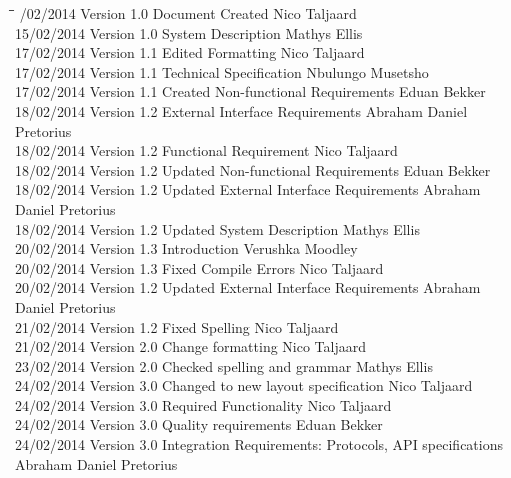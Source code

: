 \documentclass[12pt]{article}
\begin{document}
		\begin{tabbing}
			\hspace*{2.5cm}\=\hspace*{2.5cm}\=\hspace*{8cm}\=\hspace*{3cm} /02/2014 \> Version 1.0 \> Document Created \> Nico Taljaard \\
			15/02/2014 \> Version 1.0 \> System Description \> Mathys Ellis \\
			17/02/2014 \> Version 1.1 \> Edited Formatting \> Nico Taljaard \\
			17/02/2014 \> Version 1.1 \> Technical Specification \> Nbulungo Musetsho \\
			17/02/2014 \> Version 1.1 \> Created Non-functional Requirements \> Eduan Bekker \\
			18/02/2014 \> Version 1.2 \> External Interface Requirements \> Abraham Daniel Pretorius  \\
			18/02/2014 \> Version 1.2 \> Functional Requirement \> Nico Taljaard \\
			18/02/2014 \> Version 1.2 \> Updated Non-functional Requirements \> Eduan Bekker \\
			18/02/2014 \> Version 1.2 \> Updated External Interface Requirements \> Abraham Daniel Pretorius  \\
			18/02/2014 \> Version 1.2 \> Updated System Description \> Mathys Ellis \\
			20/02/2014 \> Version 1.3 \> Introduction \> Verushka Moodley \\
			20/02/2014 \> Version 1.3 \> Fixed Compile Errors \> Nico Taljaard \\
			20/02/2014 \> Version 1.2 \> Updated External Interface Requirements \> Abraham Daniel Pretorius  \\
			21/02/2014 \> Version 1.2 \> Fixed Spelling \> Nico Taljaard \\
			21/02/2014 \> Version 2.0 \> Change formatting \> Nico Taljaard \\
			23/02/2014 \> Version 2.0 \> Checked spelling and grammar \> Mathys Ellis \\
			24/02/2014 \> Version 3.0 \> Changed to new layout specification \> Nico Taljaard \\
			24/02/2014 \> Version 3.0 \> Required Functionality \> Nico Taljaard \\	
			24/02/2014 \> Version 3.0 \> Quality requirements \> Eduan Bekker \\
			24/02/2014 \> Version 3.0 \> Integration Requirements: Protocols, API specifications  \> Abraham Daniel Pretorius \\	
		\end{tabbing}
\end{document}
